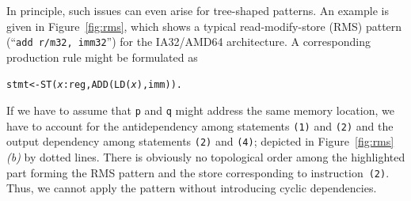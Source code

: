 In principle, such issues can even arise for tree-shaped patterns. An
example is given in Figure~\ref{fig:rms}, which shows a typical
read-modify-store (RMS) pattern (``\texttt{add~r/m32,~imm32}'') for
the IA32/AMD64 architecture. A corresponding production rule might be
formulated as
\begin{alltt}
  stmt <- ST(\textit{x}:reg, ADD(LD(\textit{x}), imm)).
\end{alltt}
If we have to assume that \texttt{p} and \texttt{q} might address the
same memory location, we have to account for the antidependency among
statements \texttt{(1)} and \texttt{(2)} and the output dependency
among statements \texttt{(2)} and \texttt{(4)}; depicted in
Figure~\ref{fig:rms}\emph{(b)\/} by dotted lines. There is obviously
no topological order among the highlighted part forming the RMS
pattern and the store corresponding to instruction~\texttt{(2)}. Thus,
we cannot apply the pattern without introducing cyclic dependencies.

